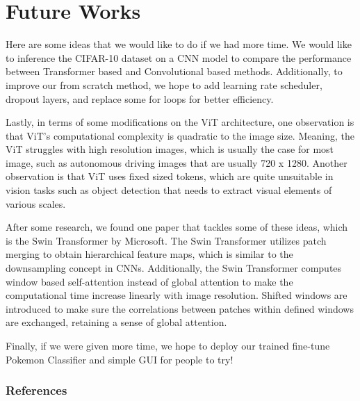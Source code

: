 \documentclass{article} %
\begin{document}
\section{Future Works}
Here are some ideas that we would like to do if we had more time. We would like to inference 
the CIFAR-10 dataset on a CNN model to compare the performance between Transformer based and 
Convolutional based methods. Additionally, to improve our from scratch method, we hope to add 
learning rate scheduler, dropout layers, and replace some for loops for better efficiency.

Lastly, in terms of some modifications on the ViT architecture, one observation is that ViT's 
computational complexity is quadratic to the image size. Meaning, the ViT struggles with high 
resolution images, which is usually the case for most image, such as autonomous driving images 
that are usually 720 x 1280. Another observation is that ViT uses fixed sized tokens, which are 
quite unsuitable in vision tasks such as object detection that needs to extract visual elements 
of various scales.

After some research, we found one paper that tackles some of these ideas, which is the Swin 
Transformer by Microsoft. The Swin Transformer utilizes patch merging to obtain hierarchical 
feature maps, which is similar to the downsampling concept in CNNs. Additionally, the Swin 
Transformer computes window based self-attention instead of global attention to make the 
computational time increase linearly with image resolution. Shifted windows are introduced to 
make sure the correlations between patches within defined windows are exchanged, retaining a 
sense of global attention.

Finally, if we were given more time, we hope to deploy our trained fine-tune Pokemon Classifier 
and simple GUI for people to try!

\subsubsection*{References}
\end{document}
